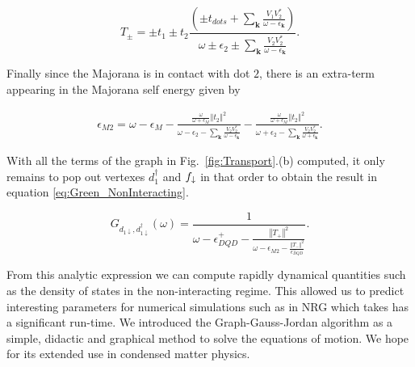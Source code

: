 \documentclass[showpacs,aps,prb,reprint,superscriptaddress]{revtex4-1}
\begin{document}
\begin{equation}
    T_{\pm}=\pm t_{1}\pm t_{2}\frac{\left(\pm t_{dots}+\sum_{\mathbf{k}}\frac{V_{1}V_{2}^{*}}{\omega-\epsilon_{\mathbf{k}}}\right)}{\omega\pm\epsilon_{2}\pm\sum_{\mathbf{k}}\frac{V_{2}V_{2}^{*}}{\omega-\epsilon_{\mathbf{k}}}}. \label{eq:T+-}
\end{equation}

Finally since the Majorana is in contact with dot $2$, there is an extra-term appearing in the  Majorana self energy given by 

    
%     
    

\begin{equation}
    \begin{aligned}
        \epsilon_{M2}=  \omega-\epsilon_{M}  -\frac{\frac{\omega}{\omega+\epsilon_{M}}\left\Vert t_{2}\right\Vert ^{2} } {\omega-\epsilon_{2}-\sum_{\mathbf{k}}\frac{V_{2}V_{2}^{*}}{\omega-\epsilon_{\mathbf{k}}}} 
         - \frac{\frac{\omega}{\omega+\epsilon_{M}}\left\Vert t_{2}\right\Vert ^{2}}{\omega+\epsilon_{2}-\sum_{\mathbf{k}}\frac{V_{2}V_{2}^{*}}{\omega+\epsilon_{\mathbf{k}}}}. 
    \end{aligned}
    \label{eq:M2_append}
\end{equation}

With all the terms of the graph in Fig.\ \ref{fig:Transport}.(b) computed, it only remains to pop out vertexes $d^\dagger_1$ and $f_\downarrow$ in that order to obtain the result in equation \eqref{eq:Green_NonInteracting}. 


\begin{equation}
    G_{{d_{1\downarrow},d_{1\downarrow}^{\dagger}}}\left(\omega\right)=\frac{1}{\omega-\epsilon_{DQD}^{+}-\frac{\left\Vert T_{+}\right\Vert ^{2}}{\omega-\epsilon_{M2}-\frac{\left\Vert T_{-}\right\Vert ^{2}}{\epsilon_{DQD}^{-}}}}.
     \label{eq:2Green_NonInteracting}
\end{equation}

\noindent From this analytic expression we can compute rapidly dynamical quantities such as the density of states in the non-interacting regime. This allowed us to predict interesting parameters for numerical simulations such as in NRG which takes has a significant run-time. We introduced the Graph-Gauss-Jordan algorithm as a simple, didactic and graphical method to solve the equations of motion. We hope for its extended use in condensed matter physics.
\end{document}

